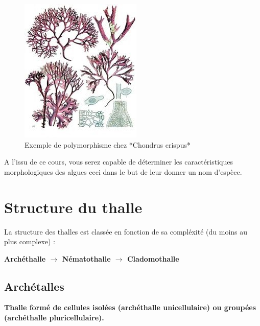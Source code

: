 \documentclass[
]{book}
\begin{document}
\begin{figure}[H]

{\centering \includegraphics[width=0.7\linewidth]{./images/polymorph_chondrus} 

}

\caption{Exemple de polymorphisme chez *Chondrus crispus*}\label{fig:polym-condrus}
\end{figure}

A l'issu de ce cours, vous serez capable de déterminer les caractéristiques morphologiques des algues ceci dans le but de leur donner un nom d'espèce.

\hypertarget{structure-du-thalle}{%
\section{Structure du thalle}\label{structure-du-thalle}}

La structure des thalles est classée en fonction de sa compléxité (du moins au plus complexe) :

\textbf{Archéthalle \(\rightarrow\) Nématothalle \(\rightarrow\) Cladomothalle}

\hypertarget{archuxe9talles}{%
\subsection{Archétalles}\label{archuxe9talles}}

\textbf{Thalle formé de cellules isolées (archéthalle unicellulaire) ou groupées (archéthalle pluricellulaire).}
\end{document}
